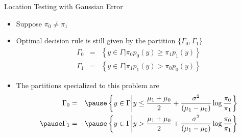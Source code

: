 \documentclass[t]{beamer}
\begin{document}
\begin{frame}{Location Testing with Gaussian Error}
  \footnotesize
  \begin{itemize}
    \item Suppose $\pi_0 \neq \pi_1$
    \item \pause Optimal decision rule is still given by the partition $\{\Gamma_0,\Gamma_1\}$
      \begin{eqnarray*}
        \Gamma_0 & = & \left\{y \in \Gamma \lvert \pi_0 p_0(y) \geq \pi_1 p_1(y) \right\} \\
        \Gamma_1 & = & \left\{y \in \Gamma \lvert \pi_1 p_1(y) > \pi_0 p_0(y) \right\} 
      \end{eqnarray*}
    \item \pause The partitions specialized to this problem are
      \begin{eqnarray*}
        \Gamma_0 & = & \pause \left\{y \in \Gamma \bigg| y \leq \frac{\mu_1+\mu_0}{2} + \frac{\sigma^2}{(\mu_1-\mu_0)}\log \frac{\pi_0}{\pi_1}\right\} \\
        \pause
        \Gamma_1 & = & \pause \left\{y \in \Gamma \bigg| y > \frac{\mu_1+\mu_0}{2} + \frac{\sigma^2}{(\mu_1-\mu_0)}\log \frac{\pi_0}{\pi_1}\right\} 
      \end{eqnarray*}
  \end{itemize}
  \normalsize
\end{frame}
\end{document}
